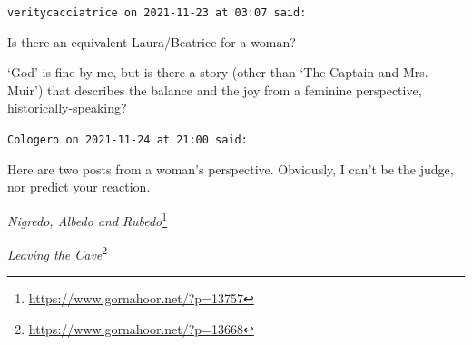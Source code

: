 \begin{footnotesize}
\begin{sffamily}
\texttt{veritycacciatrice on 2021-11-23 at 03:07 said:}

Is there an equivalent Laura/Beatrice for a woman?

`God' is fine by me, but is there a story (other than `The Captain and Mrs. Muir') that describes the balance and the joy from a feminine perspective, historically-speaking?

\hfill

\texttt{Cologero on 2021-11-24 at 21:00 said:}

Here are two posts from a woman's perspective. Obviously, I can't be the judge, nor predict your reaction.

\textit{Nigredo, Albedo and Rubedo}\footnote{\url{https://www.gornahoor.net/?p=13757}}

\textit{Leaving the Cave}\footnote{\url{https://www.gornahoor.net/?p=13668}}

\hfill

\end{sffamily}
\end{footnotesize}

